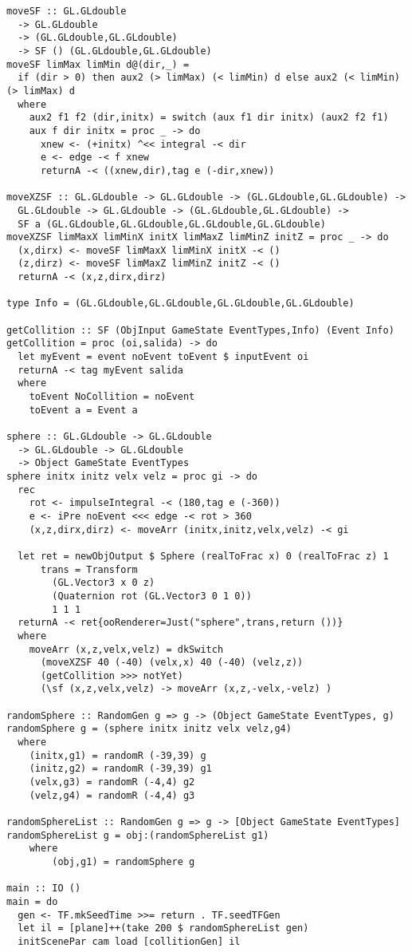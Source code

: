 \documentclass{standalone}
\begin{document}
\begin{lstlisting}
moveSF :: GL.GLdouble
  -> GL.GLdouble
  -> (GL.GLdouble,GL.GLdouble)
  -> SF () (GL.GLdouble,GL.GLdouble)
moveSF limMax limMin d@(dir,_) =
  if (dir > 0) then aux2 (> limMax) (< limMin) d else aux2 (< limMin) (> limMax) d
  where
    aux2 f1 f2 (dir,initx) = switch (aux f1 dir initx) (aux2 f2 f1)
    aux f dir initx = proc _ -> do
      xnew <- (+initx) ^<< integral -< dir
      e <- edge -< f xnew
      returnA -< ((xnew,dir),tag e (-dir,xnew))

moveXZSF :: GL.GLdouble -> GL.GLdouble -> (GL.GLdouble,GL.GLdouble) ->
  GL.GLdouble -> GL.GLdouble -> (GL.GLdouble,GL.GLdouble) ->
  SF a (GL.GLdouble,GL.GLdouble,GL.GLdouble,GL.GLdouble)
moveXZSF limMaxX limMinX initX limMaxZ limMinZ initZ = proc _ -> do
  (x,dirx) <- moveSF limMaxX limMinX initX -< ()
  (z,dirz) <- moveSF limMaxZ limMinZ initZ -< ()
  returnA -< (x,z,dirx,dirz)

type Info = (GL.GLdouble,GL.GLdouble,GL.GLdouble,GL.GLdouble)

getCollition :: SF (ObjInput GameState EventTypes,Info) (Event Info)
getCollition = proc (oi,salida) -> do
  let myEvent = event noEvent toEvent $ inputEvent oi
  returnA -< tag myEvent salida
  where
    toEvent NoCollition = noEvent
    toEvent a = Event a

sphere :: GL.GLdouble -> GL.GLdouble
  -> GL.GLdouble -> GL.GLdouble
  -> Object GameState EventTypes
sphere initx initz velx velz = proc gi -> do
  rec
    rot <- impulseIntegral -< (180,tag e (-360))
    e <- iPre noEvent <<< edge -< rot > 360
    (x,z,dirx,dirz) <- moveArr (initx,initz,velx,velz) -< gi

  let ret = newObjOutput $ Sphere (realToFrac x) 0 (realToFrac z) 1
      trans = Transform
        (GL.Vector3 x 0 z)
        (Quaternion rot (GL.Vector3 0 1 0))
        1 1 1
  returnA -< ret{ooRenderer=Just("sphere",trans,return ())}
  where
    moveArr (x,z,velx,velz) = dkSwitch
      (moveXZSF 40 (-40) (velx,x) 40 (-40) (velz,z))
      (getCollition >>> notYet)
      (\sf (x,z,velx,velz) -> moveArr (x,z,-velx,-velz) )

randomSphere :: RandomGen g => g -> (Object GameState EventTypes, g)
randomSphere g = (sphere initx initz velx velz,g4)
  where
    (initx,g1) = randomR (-39,39) g
    (initz,g2) = randomR (-39,39) g1
    (velx,g3) = randomR (-4,4) g2
    (velz,g4) = randomR (-4,4) g3

randomSphereList :: RandomGen g => g -> [Object GameState EventTypes]
randomSphereList g = obj:(randomSphereList g1)
	where
		(obj,g1) = randomSphere g

main :: IO ()
main = do
  gen <- TF.mkSeedTime >>= return . TF.seedTFGen
  let il = [plane]++(take 200 $ randomSphereList gen)
  initScenePar cam load [collitionGen] il

\end{lstlisting}
\end{document}
